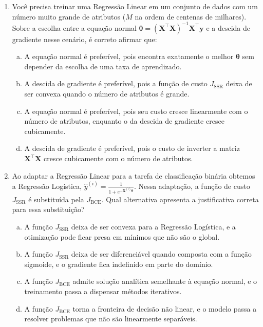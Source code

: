 \documentclass{dlproblemset}
\begin{document}
\begin{enumerate}[1)]
    \item Você precisa treinar uma Regressão Linear em um conjunto de dados com um número muito grande de atributos ($M$ na ordem de centenas de milhares). Sobre a escolha entre a equação normal $\boldsymbol{\theta} = (\mathbf{X}^\top\mathbf{X})^{-1}\mathbf{X}^\top\mathbf{y}$ e a descida de gradiente nesse cenário, é correto afirmar que:
    \begin{enumerate}[(a)]
        \item A equação normal é preferível, pois encontra exatamente o melhor $\boldsymbol{\theta}$ sem depender da escolha de uma taxa de aprendizado.
        \item A descida de gradiente é preferível, pois a função de custo $J_{\text{SSR}}$ deixa de ser convexa quando o número de atributos é grande.
        \item A equação normal é preferível, pois seu custo cresce linearmente com o número de atributos, enquanto o da descida de gradiente cresce cubicamente.
        \item A descida de gradiente é preferível, pois o custo de inverter a matriz $\mathbf{X}^\top\mathbf{X}$ cresce cubicamente com o número de atributos.
    \end{enumerate}

    \item Ao adaptar a Regressão Linear para a tarefa de classificação binária obtemos a Regressão Logística, $\hat{y}^{(i)} = \frac{1}{1+e^{-\mathbf{X}^{(i)}\boldsymbol{\theta}}}$. Nessa adaptação, a função de custo $J_{\text{SSR}}$ é substituída pela $J_{\text{BCE}}$. Qual alternativa apresenta a justificativa correta para essa substituição?
    \begin{enumerate}[(a)]
        \item A função $J_{\text{SSR}}$ deixa de ser convexa para a Regressão Logística, e a otimização pode ficar presa em mínimos que não são o global.
        \item A função $J_{\text{SSR}}$ deixa de ser diferenciável quando composta com a função sigmoide, e o gradiente fica indefinido em parte do domínio.
        \item A função $J_{\text{BCE}}$ admite solução analítica semelhante à equação normal, e o treinamento passa a dispensar métodos iterativos.
        \item A função $J_{\text{BCE}}$ torna a fronteira de decisão não linear, e o modelo passa a resolver problemas que não são linearmente separáveis.
    \end{enumerate}


\end{enumerate}
\end{document}
